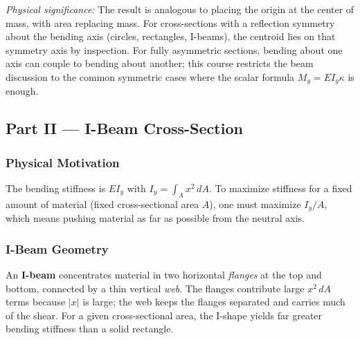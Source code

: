 \documentclass[../main.tex]{subfiles}
\begin{document}
\textit{Physical significance:} The result is analogous to placing the origin at the center of mass, with area replacing mass. For cross-sections with a reflection symmetry about the bending axis (circles, rectangles, I-beams), the centroid lies on that symmetry axis by inspection. For fully asymmetric sections, bending about one axis can couple to bending about another; this course restricts the beam discussion to the common symmetric cases where the scalar formula $M_y=EI_y\kappa$ is enough.

\subsection*{Part II — I-Beam Cross-Section}

\subsubsection*{Physical Motivation}
The bending stiffness is $EI_y$ with $I_y=\int_A x^2\,dA$. To maximize stiffness for a fixed amount of material (fixed cross-sectional area $A$), one must maximize $I_y/A$, which means pushing material as far as possible from the neutral axis.

\subsubsection*{I-Beam Geometry}
An \textbf{I-beam} concentrates material in two horizontal \emph{flanges} at the top and bottom, connected by a thin vertical \emph{web}. The flanges contribute large $x^2\,dA$ terms because $|x|$ is large; the web keeps the flanges separated and carries much of the shear. For a given cross-sectional area, the I-shape yields far greater bending stiffness than a solid rectangle.
\end{document}
